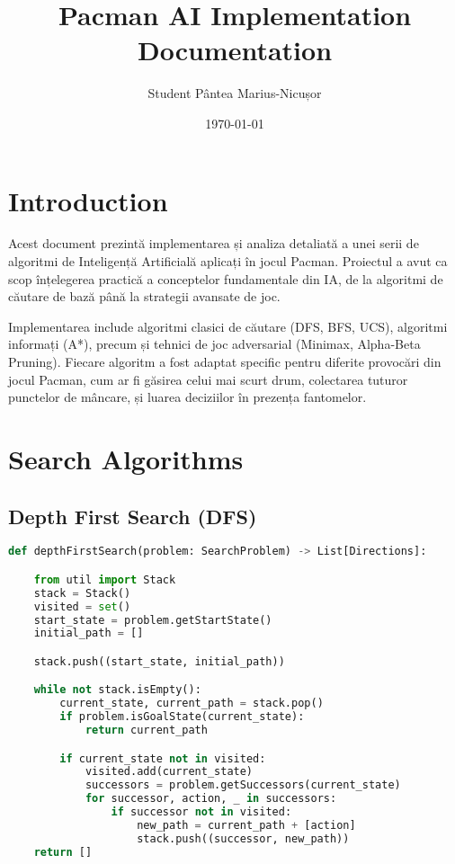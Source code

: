 \documentclass[12pt,a4paper]{article}
\title{Pacman AI Implementation Documentation}
\author{Student Pântea Marius-Nicușor }
\date{\today}
\begin{document}
\maketitle

\tableofcontents

\section{Introduction}
Acest document prezintă implementarea și analiza detaliată a unei serii de algoritmi de Inteligență Artificială aplicați în jocul Pacman. Proiectul a avut ca scop înțelegerea practică a conceptelor fundamentale din IA, de la algoritmi de căutare de bază până la strategii avansate de joc.

Implementarea include algoritmi clasici de căutare (DFS, BFS, UCS), algoritmi informați (A*), precum și tehnici de joc adversarial (Minimax, Alpha-Beta Pruning). Fiecare algoritm a fost adaptat specific pentru diferite provocări din jocul Pacman, cum ar fi găsirea celui mai scurt drum, colectarea tuturor punctelor de mâncare, și luarea deciziilor în prezența fantomelor.



\section{Search Algorithms}
\subsection{Depth First Search (DFS)}
\begin{lstlisting}[language=Python]
def depthFirstSearch(problem: SearchProblem) -> List[Directions]:

    from util import Stack
    stack = Stack()
    visited = set()
    start_state = problem.getStartState()
    initial_path = []

    stack.push((start_state, initial_path))

    while not stack.isEmpty():
        current_state, current_path = stack.pop()
        if problem.isGoalState(current_state):
            return current_path

        if current_state not in visited:
            visited.add(current_state)
            successors = problem.getSuccessors(current_state)
            for successor, action, _ in successors:
                if successor not in visited:
                    new_path = current_path + [action]
                    stack.push((successor, new_path))
    return []
\end{lstlisting}
\end{document}

